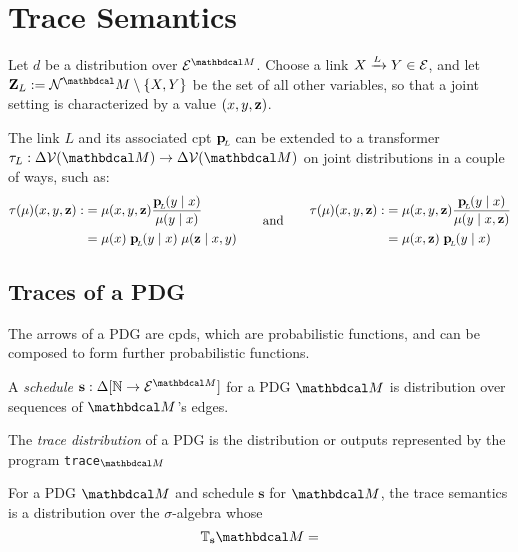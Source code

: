 \documentclass[the-pdg-manual.tex]{subfiles}
\begin{document}
	\section{Trace Semantics}
	Let $d$ be a distribution over $\Ed^{\dg M}$. 
	Choose a link $\ed LXY \in \Ed$, and let $\mathbf Z_L := \N^\dg M \setminus \{X, Y\}$ be the set of all other variables, so that a joint setting is characterized by a value $(x,y,\mathbf z)$.
	
	The link $L$ and its associated cpt $\mathbf{p}_{\!_{L}\!}$ can be extended to a transformer $\tau_L: \Delta \V(\dg M) \to \Delta \V(\dg M)$ on joint distributions in a couple of ways, such as:
\[
	\begin{aligned}
		\tau(\mu)(x,y,\mat z) :&= \mu(x,y,\mat z)\frac{\bp(y \mid x)}{\mu(y\mid x)} \\
		&= \mu(x)\; \bp(y \mid x)\; \mu(\mat z \mid x,y) 
	\end{aligned}\qquad\text{and}\qquad
	\begin{aligned}
		\tau(\mu)(x,y,\mat z) :&= \mu(x,y,\mat z) \frac{\bp(y \mid x)}{\mu(y\mid x, \mathbf z)} \\
		&= \mu(x,\mat z)\; \bp(y \mid x)
	\end{aligned}\\
\]
	
\subsection{Traces of a PDG}
The arrows of a PDG are cpds, which are probabilistic functions, and can be composed to form further probabilistic functions. 


\begin{defn}
	A \emph{schedule} $\mathbf s : \Delta[\mathbb N \to \Ed^{\dg M}]$ for a PDG $\dg M$ is distribution over sequences of $\dg M$'s edges. 
\end{defn}
\begin{defn}
   The \emph{trace distribution} of a PDG is the distribution or outputs represented by the program \texttt{trace}$_{\dg M}$

\end{defn}
\begin{defn}
	For a PDG $\dg M$ and schedule $\mathbf s$ for $\dg M$, the trace semantics is a distribution
	over the $\sigma$-algebra  whose 
	\[ \mathbb{T}_{\bf s}{\dg M} = 
	 \]
\end{defn}
\end{document}
